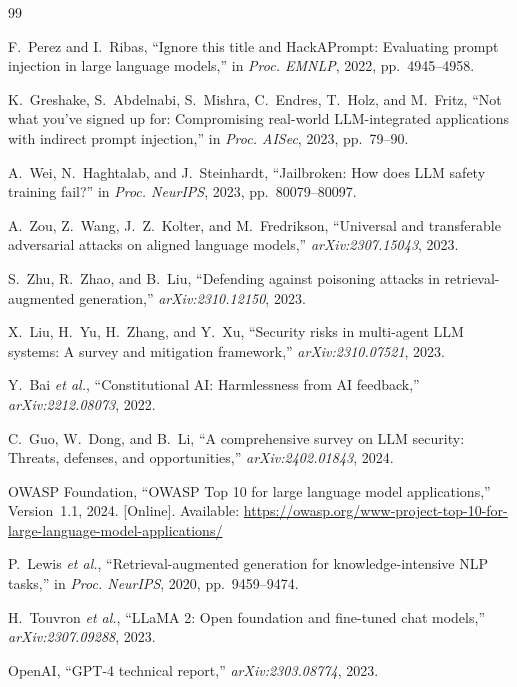 \documentclass[journal,twoside]{IEEEtran}
\begin{document}
\balance

\begin{thebibliography}{99}

F.~Perez and I.~Ribas, ``Ignore this title and HackAPrompt: Evaluating prompt injection in large language models,'' in \emph{Proc. EMNLP}, 2022, pp.~4945--4958.

K.~Greshake, S.~Abdelnabi, S.~Mishra, C.~Endres, T.~Holz, and M.~Fritz, ``Not what you've signed up for: Compromising real-world LLM-integrated applications with indirect prompt injection,'' in \emph{Proc. AISec}, 2023, pp.~79--90.

A.~Wei, N.~Haghtalab, and J.~Steinhardt, ``Jailbroken: How does LLM safety training fail?'' in \emph{Proc. NeurIPS}, 2023, pp.~80079--80097.

A.~Zou, Z.~Wang, J.~Z.~Kolter, and M.~Fredrikson, ``Universal and transferable adversarial attacks on aligned language models,'' \emph{arXiv:2307.15043}, 2023.

S.~Zhu, R.~Zhao, and B.~Liu, ``Defending against poisoning attacks in retrieval-augmented generation,'' \emph{arXiv:2310.12150}, 2023.

X.~Liu, H.~Yu, H.~Zhang, and Y.~Xu, ``Security risks in multi-agent LLM systems: A survey and mitigation framework,'' \emph{arXiv:2310.07521}, 2023.

Y.~Bai \emph{et al.}, ``Constitutional AI: Harmlessness from AI feedback,'' \emph{arXiv:2212.08073}, 2022.

C.~Guo, W.~Dong, and B.~Li, ``A comprehensive survey on LLM security: Threats, defenses, and opportunities,'' \emph{arXiv:2402.01843}, 2024.

{OWASP Foundation}, ``OWASP Top 10 for large language model applications,'' Version~1.1, 2024. [Online]. Available: \url{https://owasp.org/www-project-top-10-for-large-language-model-applications/}

P.~Lewis \emph{et al.}, ``Retrieval-augmented generation for knowledge-intensive NLP tasks,'' in \emph{Proc. NeurIPS}, 2020, pp.~9459--9474.

H.~Touvron \emph{et al.}, ``LLaMA 2: Open foundation and fine-tuned chat models,'' \emph{arXiv:2307.09288}, 2023.

{OpenAI}, ``GPT-4 technical report,'' \emph{arXiv:2303.08774}, 2023.


\end{thebibliography}
\end{document}
